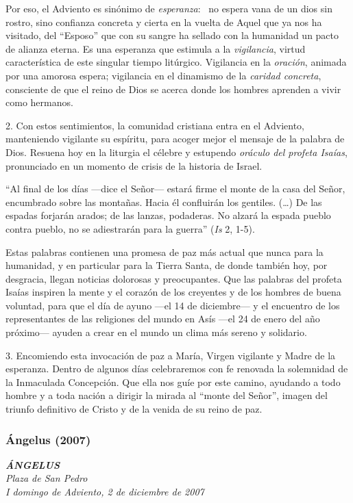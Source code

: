 Por eso, el Adviento es sinónimo de \emph{esperanza}:~ no espera vana de
un dios sin rostro, sino confianza concreta y cierta en la vuelta de
Aquel que ya nos ha visitado, del ``Esposo'' que con su sangre ha
sellado con la humanidad un pacto de alianza eterna. Es una esperanza
que estimula a la \emph{vigilancia}, virtud característica de este
singular tiempo litúrgico. Vigilancia en la \emph{oración}, animada por
una amorosa espera; vigilancia en el dinamismo de la \emph{caridad
	concreta}, consciente de que el reino de Dios se acerca donde los
hombres aprenden a vivir como hermanos.

2. Con estos sentimientos, la comunidad cristiana entra en el Adviento,
manteniendo vigilante su espíritu, para acoger mejor el mensaje de la
palabra de Dios. Resuena hoy en la liturgia el célebre y estupendo
\emph{oráculo del profeta Isaías}, pronunciado en un momento de crisis
de la historia de Israel.

``Al final de los días ---dice el Señor--- estará firme el monte de la
casa del Señor, encumbrado sobre las montañas. Hacia él confluirán los
gentiles. (\ldots{}) De las espadas forjarán arados; de las lanzas,
podaderas. No alzará la espada pueblo contra pueblo, no se adiestrarán
para la guerra'' (\emph{Is} 2, 1-5).

Estas palabras contienen una promesa de paz más actual que nunca para la
humanidad, y en particular para la Tierra Santa, de donde también hoy,
por desgracia, llegan noticias dolorosas y preocupantes. Que las
palabras del profeta Isaías inspiren la mente y el corazón de los
creyentes y de los hombres de buena voluntad, para que el día de ayuno
---el 14 de diciembre--- y el encuentro de los representantes de las
religiones del mundo en Asís ---el 24 de enero del año próximo--- ayuden
a crear en el mundo un clima más sereno y solidario.

3. Encomiendo esta invocación de paz a María, Virgen vigilante y Madre
de la esperanza. Dentro de algunos días celebraremos con fe renovada la
solemnidad de la Inmaculada Concepción. Que ella nos guíe por este
camino, ayudando a todo hombre y a toda nación a dirigir la mirada al
``monte del Señor'', imagen del triunfo definitivo de Cristo y de la
venida de su reino de paz.

\subsubsection{Ángelus (2007)}
\emph{\textbf{ÁNGELUS}\\[2\baselineskip]Plaza de San Pedro\\
	I domingo de Adviento, 2 de diciembre de 2007}

